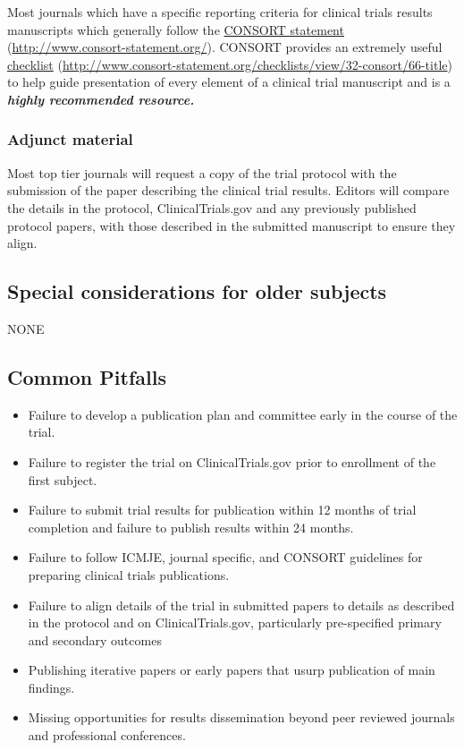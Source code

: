 \documentclass[]{book}
\providecommand{\tightlist}{%
  \setlength{\itemsep}{0pt}\setlength{\parskip}{0pt}}
\begin{document}
Most journals which have a specific reporting criteria for clinical
trials results manuscripts which generally follow the
\href{http://www.consort-statement.org/}{CONSORT statement}
(\url{http://www.consort-statement.org/}). CONSORT provides an extremely
useful
\href{http://www.consort-statement.org/checklists/view/32-consort/66-title}{checklist}
(\url{http://www.consort-statement.org/checklists/view/32-consort/66-title})
to help guide presentation of every element of a clinical trial
manuscript and is a \textbf{\emph{highly recommended resource.}}

\subsubsection{Adjunct material}\label{adjunct-material}

Most top tier journals will request a copy of the trial protocol with
the submission of the paper describing the clinical trial results.
Editors will compare the details in the protocol, ClinicalTrials.gov and
any previously published protocol papers, with those described in the
submitted manuscript to ensure they align.

\subsection{Special considerations for older
subjects}\label{special-considerations-for-older-subjects-15}

NONE

\subsection{Common Pitfalls}\label{common-pitfalls-17}

\begin{itemize}
\tightlist
\item
  Failure to develop a publication plan and committee early in the
  course of the trial.
\item
  Failure to register the trial on ClinicalTrials.gov prior to
  enrollment of the first subject.
\item
  Failure to submit trial results for publication within 12 months of
  trial completion and failure to publish results within 24 months.
\item
  Failure to follow ICMJE, journal specific, and CONSORT guidelines for
  preparing clinical trials publications.
\item
  Failure to align details of the trial in submitted papers to details
  as described in the protocol and on ClinicalTrials.gov, particularly
  pre-specified primary and secondary outcomes
\item
  Publishing iterative papers or early papers that usurp publication of
  main findings.
\item
  Missing opportunities for results dissemination beyond peer reviewed
  journals and professional conferences.
\end{itemize}
\end{document}
